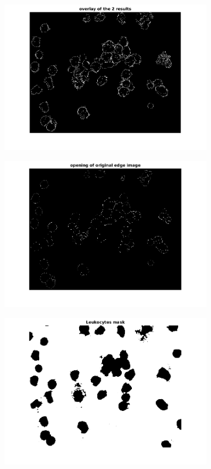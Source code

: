 \begin{figure}[htbp]
\begin{subfigure}[b]{0.4\textwidth}
        \includegraphics[width=\textwidth]{img/final/figure5.png}
        \caption{ }
        \label{fig:fig5}
    \end{subfigure}
    \begin{subfigure}[b]{0.4\textwidth}
        \includegraphics[width=\textwidth]{img/final/figure6.png}
        \caption{ }
        \label{fig:fig6}
    \end{subfigure}
    \begin{subfigure}[b]{0.4\textwidth}
        \includegraphics[width=\textwidth]{img/final/figure7.png}

\end{subfigure}
\end{figure}
